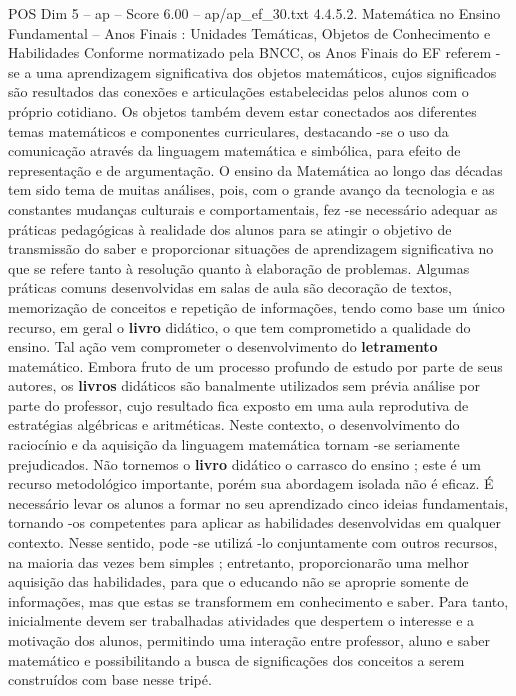 \begin{textsample}{POS Dim 5 – ap – Score 6.00 – ap/ap\_ef\_30.txt}  \label{ex:f5_pos_165}
4.4.5.2.
Matemática no Ensino Fundamental – Anos Finais : Unidades Temáticas, Objetos de Conhecimento e Habilidades Conforme normatizado pela BNCC, os Anos Finais do EF referem -se a uma aprendizagem significativa dos objetos matemáticos, cujos significados são resultados das conexões e articulações estabelecidas pelos alunos com o próprio cotidiano.
Os objetos também devem estar conectados aos diferentes temas matemáticos e componentes curriculares, destacando -se o uso da comunicação através da linguagem matemática e simbólica, para efeito de representação e de argumentação.
O ensino da Matemática ao longo das décadas tem sido tema de muitas análises, pois, com o grande avanço da tecnologia e as constantes mudanças culturais e comportamentais, fez -se necessário adequar as práticas pedagógicas à realidade dos alunos para se atingir o objetivo de transmissão do saber e proporcionar situações de aprendizagem significativa no que se refere tanto à resolução quanto à elaboração de problemas.
Algumas práticas comuns desenvolvidas em salas de aula são decoração de textos, memorização de conceitos e repetição de informações, tendo como base um único recurso, em geral o \textbf{livro} didático, o que tem comprometido a qualidade do ensino.
Tal ação vem comprometer o desenvolvimento do \textbf{letramento} matemático.
Embora fruto de um processo profundo de estudo por parte de seus autores, os \textbf{livros} didáticos são banalmente utilizados sem prévia análise por parte do professor, cujo resultado fica exposto em uma aula reprodutiva de estratégias algébricas e aritméticas.
Neste contexto, o desenvolvimento do raciocínio e da aquisição da linguagem matemática tornam -se seriamente prejudicados.
Não tornemos o \textbf{livro} didático o carrasco do ensino ; este é um recurso metodológico importante, porém sua abordagem isolada não é eficaz.
É necessário levar os alunos a formar no seu aprendizado cinco ideias fundamentais, tornando -os competentes para aplicar as habilidades desenvolvidas em qualquer contexto.
Nesse sentido, pode -se utilizá -lo conjuntamente com outros recursos, na maioria das vezes bem simples ; entretanto, proporcionarão uma melhor aquisição das habilidades, para que o educando não se aproprie somente de informações, mas que estas se transformem em conhecimento e saber.
Para tanto, inicialmente devem ser trabalhadas atividades que despertem o interesse e a motivação dos alunos, permitindo uma interação entre professor, aluno e saber matemático e possibilitando a busca de significações dos conceitos a serem construídos com base nesse tripé.

\end{textsample}
